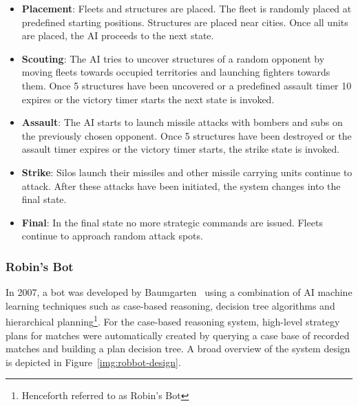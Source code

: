         \begin{itemize}
        \item \textbf{Placement}: Fleets and structures are placed. The fleet is randomly placed at predefined starting positions. Structures are placed near cities. Once all units are placed, the AI proceeds to the next state.
        \item \textbf{Scouting}: The AI tries to uncover structures of a random opponent by moving fleets towards occupied territories and launching fighters towards them. Once 5 structures have been uncovered or a predefined assault timer 10 expires or the victory timer starts the next state is invoked.
        \item \textbf{Assault}: The AI starts to launch missile attacks with bombers and subs on the previously chosen opponent. Once 5 structures have been destroyed or the assault timer expires or the victory timer starts, the strike state is invoked.
        \item \textbf{Strike}: Silos launch their missiles and other missile carrying units continue to attack. After these attacks have been initiated, the system changes into the final state.
        \item \textbf{Final}: In the final state no more strategic commands are issued. Fleets continue to approach random attack spots.
        \end{itemize}
        
        \subsubsection{Robin's Bot}
        \label{sec:robbot}

        In 2007, a bot was developed by Baumgarten~\cite{robbot} using a combination of AI machine learning techniques such as case-based reasoning, decision tree algorithms and hierarchical planning\footnote{Henceforth referred to as Robin's Bot}. For the case-based reasoning system, high-level strategy plans for matches were automatically created by querying a case base of recorded matches and building a plan decision tree. A broad overview of the system design is depicted in Figure~\ref{img:robbot-design}. 
        
